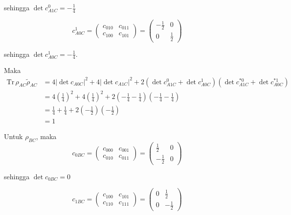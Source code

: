 \begin{enumerate}
	sehingga $\det c_{A1C}^0 = -\frac{1}{4}$
	
	\begin{equation}
		c_{A0C}^1=
		\begin{pmatrix}
			c_{010} & c_{011} \\
			c_{100} & c_{101}
		\end{pmatrix}=
		\begin{pmatrix}
			-\frac{1}{2} & 0 \\
			0 & \frac{1}{2}
		\end{pmatrix}
	\end{equation}
	
	sehingga $\det c_{A0C}^1 = -\frac{1}{4}$.
	
	Maka
	\begin{equation}
		\begin{aligned}
			\mathrm{Tr}\,\rho_{AC}\tilde{\rho}_{AC}
			&=4|\det c_{A0C}|^2+4|\det c_{A1C}|^2+2(\det c_{A1C}^0+ \det c_{A0C}^1)(\det c^{*0}_{A1C} + \det c^{*1}_{A0C})\\
			&=4(\frac{1}{4})^2+4(\frac{1}{4})^2+2(-\frac{1}{4}-\frac{1}{4})(-\frac{1}{4}-\frac{1}{4})\\
			&=\frac{1}{4}+\frac{1}{4}+2(-\frac{1}{2})(-\frac{1}{2})\\
			&=1
		\end{aligned}
	\end{equation}
	
	Untuk $\rho_{BC}$, maka
	\begin{equation}
		c_{0BC}=
		\begin{pmatrix}
			c_{000} & c_{001} \\
			c_{010} & c_{011}
		\end{pmatrix}=
		\begin{pmatrix}
			\frac{1}{2} & 0 \\
			-\frac{1}{2} & 0
		\end{pmatrix}
	\end{equation}
	
	sehingga $\det c_{0BC} = 0$
	
	\begin{equation}
		c_{1BC}=
		\begin{pmatrix}
			c_{100} & c_{101} \\
			c_{110} & c_{111}
		\end{pmatrix}=
		\begin{pmatrix}
			0 & \frac{1}{2} \\
			0 & -\frac{1}{2}
		\end{pmatrix}
	\end{equation}
	

\end{enumerate}
